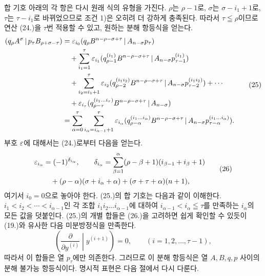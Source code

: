 합 기호 아래의 각 항은 다시 원래 식의 유형을 가진다. $\rho$는 $\rho-1$로, $\sigma$는 $\sigma-i_1+1$로, $\tau$는 $\tau-i_1$로 바뀌었으므로 조건 1)은 오히려 더 강하게 충족된다. 따라서 $\tau\leqq\rho$이므로 연산 (24.)을 $\tau$번 적용할 수 있고, 원하는 분해 항등식을 얻는다.
\begin{equation}
\begin{aligned}
(q_\rho A^\sigma\,|\,p_\tau B_{\rho+\sigma-\tau})
&=\varepsilon_{i_0}(q_\rho B^{n-\rho-\sigma+\tau}\,|\,A_{n-\sigma}p_\tau)\\
&\quad+\sum_{i_1=1}^{\tau}\varepsilon_{i_1}
 (q_{\rho-1}^{(i_1)}B^{n-\rho-\sigma+\tau}\,|\,A_{n-\sigma}p_{\tau-1}^{(i_1)})\\
&\quad+\sum_{i_2=i_1+1}^{\tau}\varepsilon_{i_2}
 (q_{\rho-2}^{(i_1i_2)}B^{n-\rho-\sigma+\tau}\,|\,A_{n-\sigma}p_{\tau-2}^{(i_1i_2)})+\cdots\\
&\quad+\varepsilon_{i_\tau}(q_{\rho-\tau}^{(i_1\ldots i_\tau)}B^{n-\rho-\sigma+\tau}\,|\,A_{n-\sigma})\\
&=\sum_{\alpha=0}^{\tau}\sum_{i_\alpha=i_{\alpha-1}+1}^{\tau}\varepsilon_{i_\alpha}
 (q_{\rho-\alpha}^{(i_1\ldots i_\alpha)}B^{n-\rho-\sigma+\tau}\,|\,A_{n-\sigma}p_{\tau-\alpha}^{(i_1\ldots i_\alpha)}).
\end{aligned}
\tag{25}
\end{equation}
부호 $\varepsilon$에 대해서는 (24.)로부터 다음을 얻는다.
\begin{equation}
\begin{aligned}
\varepsilon_{i_\alpha}&=(-1)^{\delta_{i_\alpha}},\qquad
\delta_{i_\alpha}=\sum_{\beta=1}^{\alpha}(\rho-\beta+1)(i_{\beta-1}+i_\beta+1)\\
&\quad +(\rho-\alpha)(\sigma+i_\alpha+\alpha)+(\sigma+\tau+\alpha)(n+1),
\end{aligned}
\tag{26}
\end{equation}
여기서 $i_0=0$으로 놓아야 한다. (25.)의 합 기호는 다음과 같이 이해한다. $i_1<i_2<\cdots<i_{\alpha-1}$인 각 조합 $i_1i_2\ldots i_{\alpha-1}$에 대하여 $i_{\alpha-1}<i_\alpha\leqq\tau$를 만족하는 $i_\alpha$의 모든 값을 덧붙인다. (25.)의 개별 합들은 (26.)을 고려하면 쉽게 확인할 수 있듯이 (19.)와 유사한 다음 미분방정식을 만족한다.
\begin{equation}
 \left(\frac{\partial}{\partial y^{(i)}}\middle|y^{(i+1)}\right)=0,
 \qquad (i=1,2,\ldots,\tau-1),
\tag{27}
\end{equation}
따라서 이 합들은 열 $p_\tau$에만 의존한다. 그러므로 이 분해 항등식은 열 $A,B,q,p$ 사이의 분해 불가능 항등식이다. 명시적 표현은 다음 절에서 다시 다룬다.


